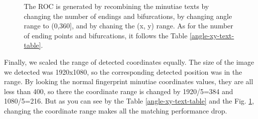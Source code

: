 \begin{figure}[ht!]
    
    \caption{The ROC is generated by recombining the minutiae texts by changing the number of endings and bifurcations, by changing angle range to (0,360], and by chaning the (x, y) range. As for the number of ending points and bifurcations, it follows the Table \ref{angle-xy-text-table}.}
    \label{angle-xy-text}
\end{figure}

Finally, we scaled the range of detected coordinates equally. The size of the image we detected was 1920x1080, so the corresponding detected position was in the range. By looking the normal fingerprint minutiae coordinates values, they are all less than 400, so there the coordinate range is changed by 1920/5=384 and 1080/5=216. But as you can see by the Table \ref{angle-xy-text-table} and the Fig. \ref{angle-xy-text}, changing the coordinate range makes all the matching performance drop.




